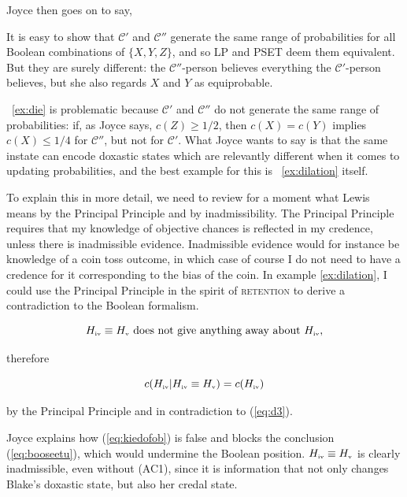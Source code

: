 \documentclass[phd,12pt,oneside]{ubcthesis}
\begin{document}
{\noindent}Joyce then goes on to say,

\begin{quotex}
  It is easy to show that $\mathcal{C}'$ and $\mathcal{C}''$ generate
  the same range of probabilities for all Boolean combinations of
  $\{X,Y,Z\}$, and so LP and PSET deem them equivalent. But they are
  surely different: the $\mathcal{C}''$-person believes everything the
  $\mathcal{C}'$-person believes, but she also regards $X$ and $Y$ as
  equiprobable.
\end{quotex}

{\noindent}{\Xample}~\ref{ex:die} is problematic because $\mathcal{C}'$ and
$\mathcal{C}''$ do not generate the same range of probabilities: if,
as Joyce says, $c(Z)\geq1/2$, then $c(X)=c(Y)$ implies $c(X)\leq{}1/4$
for $\mathcal{C}''$, but not for $\mathcal{C}'$. What Joyce wants to
say is that the same instate can encode doxastic states which are
relevantly different when it comes to updating probabilities, and the
best example for this is {\xample}~\ref{ex:dilation} itself.

To explain this in more detail, we need to review for a moment what
Lewis means by the Principal Principle and by inadmissibility. The
Principal Principle requires that my knowledge of objective chances is
reflected in my credence, unless there is inadmissible evidence.
Inadmissible evidence would for instance be knowledge of a coin toss
outcome, in which case of course I do not need to have a credence for
it corresponding to the bias of the coin. In example
\ref{ex:dilation}, I could use the Principal Principle in the spirit
of \textsc{retention} to derive a contradiction to the Boolean
formalism. 

\begin{equation}
  \label{eq:kiedofob}
H_{\mbox{\tiny{iv}}}\equiv{}H_{\mbox{\tiny{v}}}\mbox{ does not give anything away about }H_{\mbox{\tiny{iv}}}, 
\end{equation}

{\noindent}therefore

\begin{equation}
  \label{eq:booseetu}
c(H_{\mbox{\tiny{iv}}}|H_{\mbox{\tiny{iv}}}\equiv{}H_{\mbox{\tiny{v}}})=c(H_{\mbox{\tiny{iv}}})  
\end{equation}

{\noindent}by the Principal Principle and in contradiction to (\ref{eq:d3}).

Joyce explains how (\ref{eq:kiedofob}) is false and blocks the
conclusion (\ref{eq:booseetu}), which would undermine the Boolean
position. $H_{\mbox{\tiny{iv}}}\equiv{}H_{\mbox{\tiny{v}}}$ is clearly
inadmissible, even without (AC1), since it is information that not
only changes Blake's doxastic state, but also her credal
state.
\end{document}
